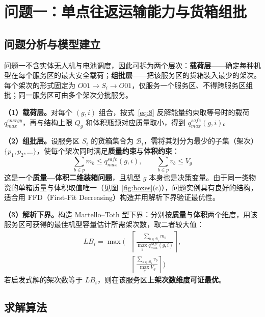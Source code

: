 \section{问题一：单点往返运输能力与货箱组批}
\label{sec:q1}

\subsection{问题分析与模型建立}

问题一不含实体无人机与电池调度，因此可拆为两个层次：\textbf{载荷层}——确定每种机型在每个服务区的最大安全载荷；\textbf{组批层}——把该服务区的货箱装入最少的架次。每个架次的形式固定为 $O01\to S_i\to O01$，仅服务一个服务区、不得跨服务区组批；同一服务区可由多个架次分批服务。

\textbf{（1）载荷层。}对每个 $(g,i)$ 组合，按式~\eqref{eq:8} 反解能量约束取等号时的载荷 $q_{max}^{energy}$，再与结构上限 $Q_{g}$ 和体积瓶颈对应质量取小，得到 $q_{max}^{safe}(g,i)$。

\textbf{（2）组批层。}设服务区 $S_i$ 的货箱集合为 $\mathcal{B}_i$，需将其划分为最少的子集（架次）$\{p_1,p_2,\dots\}$，使每个架次同时满足\textbf{质量约束}与\textbf{体积约束}：
\begin{equation}
	\label{eq:19}
	\sum_{b\in p}m_{b}\le q_{max}^{safe}(g,i),\qquad \sum_{b\in p}v_{b}\le V_{g}
\end{equation}
这是一个\textbf{质量—体积二维装箱问题}\cite{martello1990binpacking,lodi2002threedim}，且机型 $g$ 本身也是决策变量。由于同一类物资的单箱质量与体积取值唯一（见图~\ref{fig:boxes}(c)），问题实例具有良好的结构，适合用 FFD（First-Fit Decreasing）构造并用解析下界验证最优性。

\textbf{（3）解析下界。}构造 Martello--Toth 型下界\cite{martello1990binpacking}：分别按\textbf{质量}与\textbf{体积}两个维度，用该服务区可获得的最佳机型容量估计所需架次数，取二者较大值：
\begin{equation}
	\label{eq:20}
	\begin{aligned}
		LB_i=\max\Bigg(&\left\lceil\frac{\sum_{b\in\mathcal{B}_i}m_{b}}{\max_{g}q_{max}^{safe}(g,i)}\right\rceil,\\
		              &\left\lceil\frac{\sum_{b\in\mathcal{B}_i}v_{b}}{\max_{g}V_{g}}\right\rceil\Bigg)
	\end{aligned}
\end{equation}
若启发式解的架次数等于 $LB_i$，则在该服务区上\textbf{架次数维度可证最优}。

\subsection{求解算法}

